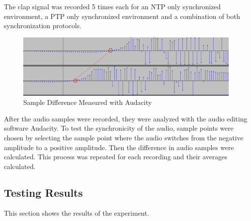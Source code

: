 \documentclass[hidelinks,12pt]{report} %
\begin{document}
The clap signal was recorded 5 times each for an NTP only synchronized environment, a PTP only synchronized environment and a combination of both synchronization protocols. 


\begin{figure}[h]
\centering
\includegraphics[scale = 1.0]{fig5.2} 
\caption{Sample Difference Measured with Audacity}
\label{fig}
\end{figure}

After the audio samples were recorded, they were analyzed with the audio editing software Audacity. To test the synchronicity of the audio, sample points were chosen by selecting the sample point where the audio switches from the negative amplitude to a positive amplitude. Then the difference in audio samples were calculated. This process was repeated for each recording and their averages calculated. 

\subsection{Testing Results}

This section shows the results of the experiment.

\begin{table}[h]
\begin{center}
\label{tab:tablelabel}
\caption{Summary of sample deviation using different synchronization protocols}
\end{center}
\end{table}
\end{document}
